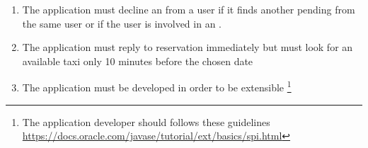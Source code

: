 \begin{enumerate}[resume*]
	\item The application must decline an  from a user if it finds another pending  from the same user or if the user is involved in an .	
	\item The application must reply to reservation immediately but must look for an available taxi only 10 minutes before the chosen date
	\item The application must be developed in order to be extensible \footnote{The application developer should follows these guidelines \url{https://docs.oracle.com/javase/tutorial/ext/basics/spi.html}}


\end{enumerate}

